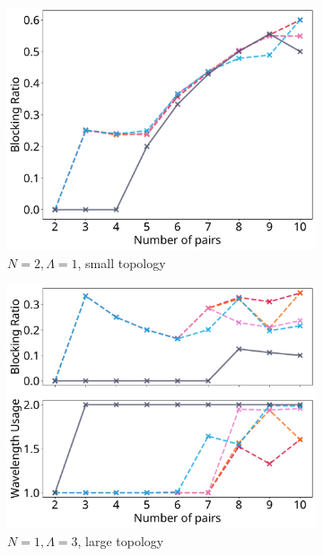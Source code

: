 \begin{figure}[H]
	\centering
	\begin{subfigure}{0.32\textwidth}
	\includegraphics[width=\textwidth]{pictures/plots/n_pairs/x-2-1-s.pdf}
	\caption{$N=2, {\Lambda} = 1$, small topology}
	\end{subfigure}
	\begin{subfigure}{0.32\textwidth}
	\includegraphics[width=\textwidth]{pictures/plots/n_pairs/x-1-2-m.pdf}
	\caption{$N=1, {\Lambda} = 3$, large topology}
	\label{pairb}
	\end{subfigure}
	\begin{subfigure}{0.32\textwidth}

\end{subfigure}
\end{figure}

